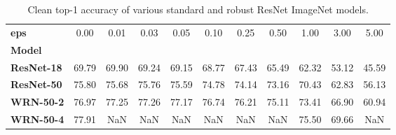 \begin{table}
\centering
\caption{Clean top-1 accuracy of various standard and robust ResNet ImageNet models.}
\label{app:imagenet-resnets-accuracies}
\begin{tabular}{l|c|c|c|c|c|c|c|c|c|c}
\toprule
\textbf{eps} &  0.00 &  0.01 &  0.03 &  0.05 &  0.10 &  0.25 &  0.50 &  1.00 &  3.00 &  5.00 \\
\textbf{Model    } &       &       &       &       &       &       &       &       &       &       \\
\midrule
\textbf{ResNet-18} & 69.79 & 69.90 & 69.24 & 69.15 & 68.77 & 67.43 & 65.49 & 62.32 & 53.12 & 45.59 \\
\textbf{ResNet-50} & 75.80 & 75.68 & 75.76 & 75.59 & 74.78 & 74.14 & 73.16 & 70.43 & 62.83 & 56.13 \\
\textbf{WRN-50-2 } & 76.97 & 77.25 & 77.26 & 77.17 & 76.74 & 76.21 & 75.11 & 73.41 & 66.90 & 60.94 \\
\textbf{WRN-50-4 } & 77.91 &   NaN &   NaN &   NaN &   NaN &   NaN &   NaN & 75.50 & 69.66 &   NaN \\
\bottomrule
\end{tabular}
\end{table}
